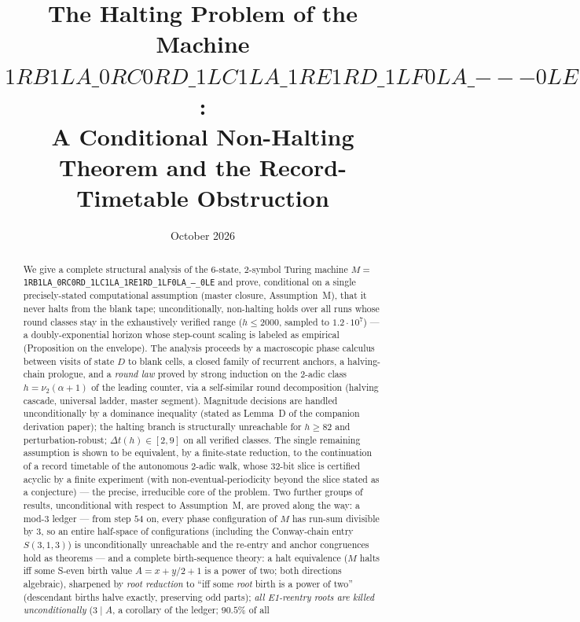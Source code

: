 \documentclass[11pt]{amsart}
\title{The Halting Problem of the Machine $1RB1LA\_0RC0RD\_1LC1LA\_1RE1RD\_1LF0LA\_{---}0LE$:\\ \large A Conditional Non-Halting Theorem and the Record-Timetable Obstruction}
\author{}
\date{October 2026}
\theoremstyle{definition}
\begin{document}
\maketitle

\begin{abstract}
We give a complete structural analysis of the $6$-state, $2$-symbol
Turing machine $M=$ \texttt{1RB1LA\_0RC0RD\_1LC1LA\_1RE1RD\_1LF0LA\_---\_0LE}
and prove, conditional on a single precisely-stated computational
assumption (master closure, Assumption~M), that it never halts from the
blank tape; unconditionally, non-halting holds over all runs whose round
classes stay in the exhaustively verified range ($h\le2000$, sampled to
$1.2\cdot10^{7}$) --- a doubly-exponential horizon whose step-count
scaling is labeled as empirical (Proposition on the envelope). The
analysis proceeds by
a macroscopic phase calculus between visits of state $D$ to blank cells,
a closed family of recurrent anchors, a halving-chain prologue, and a
\emph{round law} proved by strong induction on the $2$-adic class
$h=\nu_2(\alpha+1)$ of the leading counter, via a self-similar round
decomposition (halving cascade, universal ladder, master segment).
Magnitude decisions are handled unconditionally by a dominance inequality
(stated as Lemma~D of the companion derivation paper); the halting branch
is structurally unreachable for $h\ge82$
and perturbation-robust; $\Delta t(h)\in[2,9]$ on all verified classes.
The
single remaining assumption is shown to be equivalent, by a
finite-state reduction, to the continuation of a record timetable of the
autonomous $2$-adic walk, whose $32$-bit slice is certified acyclic by a
finite experiment (with non-eventual-periodicity beyond the slice stated
as a conjecture) --- the
precise, irreducible core of the problem. Two further groups of results,
unconditional
with respect to Assumption~M, are proved along the way: a mod-3 ledger --- from
step $54$ on, every phase configuration of $M$ has run-sum divisible by $3$, so
an entire half-space of configurations (including the Conway-chain entry
$S(3,1,3)$) is unconditionally unreachable and the re-entry and anchor
congruences hold as theorems --- and a complete birth-sequence theory:
a halt equivalence ($M$ halts iff some S-even birth value $A=x+y/2+1$ is a
power of two; both directions algebraic), sharpened by \emph{root reduction}
to ``iff some \emph{root} birth is a power of two'' (descendant births halve
exactly, preserving odd parts); \emph{all E1-reentry roots are killed
unconditionally} ($3\mid A$, a corollary of the ledger; $90.5\%$ of all

\end{abstract}
\end{document}
